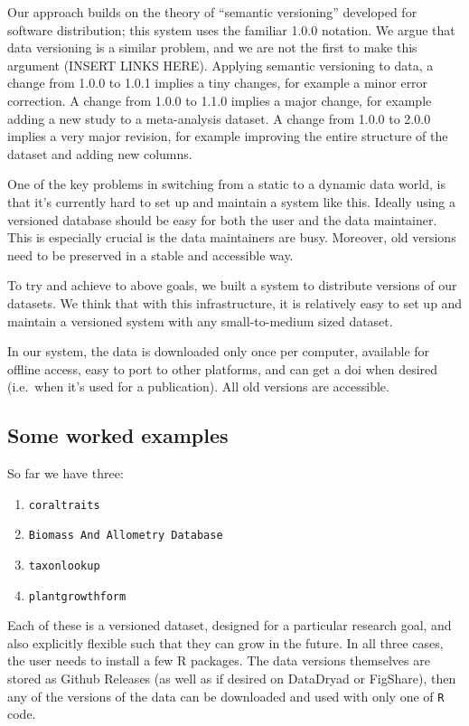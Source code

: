 \documentclass[a4paper,11pt]{article}
\begin{document}
Our approach builds on the theory of ``semantic versioning'' developed
for software distribution; this system uses the familiar 1.0.0 notation.
We argue that data versioning is a similar problem, and we are not the
first to make this argument (INSERT LINKS HERE). Applying semantic
versioning to data, a change from 1.0.0 to 1.0.1 implies a tiny changes,
for example a minor error correction. A change from 1.0.0 to 1.1.0
implies a major change, for example adding a new study to a meta-analysis
dataset. A change from 1.0.0 to 2.0.0 implies a very major revision, for
example improving the entire structure of the dataset and adding new
columns.

One of the key problems in switching from a static to a dynamic data
world, is that it's currently hard to set up and maintain a system like
this. Ideally using a versioned database should be easy for both the
user and the data maintainer. This is especially crucial is the data
maintainers are busy. Moreover, old versions need to be preserved in a
stable and accessible way.

To try and achieve to above goals, we built a system to distribute
versions of our datasets. We think that with this infrastructure, it is
relatively easy to set up and maintain a versioned system with any
small-to-medium sized dataset.

In our system, the data is downloaded only once per computer, available
for offline access, easy to port to other platforms, and can get a doi
when desired (i.e.~when it's used for a publication). All old versions
are accessible.

\subsection{Some worked examples}

So far we have three:

\begin{enumerate}
\def\labelenumi{\arabic{enumi}.}
\itemsep1pt\parskip0pt
\item
  \texttt{coraltraits}
\item
  \texttt{Biomass And Allometry Database} \citep{Falster-2015}
\item
  \texttt{taxonlookup} \citep{Pennell-2015a}
\item
  \texttt{plantgrowthform}
\end{enumerate}

Each of these is a versioned dataset, designed for a particular research
goal, and also explicitly flexible such that they can grow in the
future. In all three cases, the user needs to install a few R packages.
The data versions themselves are stored as Github Releases (as well as
if desired on DataDryad or FigShare), then any of the versions of the
data can be downloaded and used with only one of \texttt{R} code.
\end{document}
